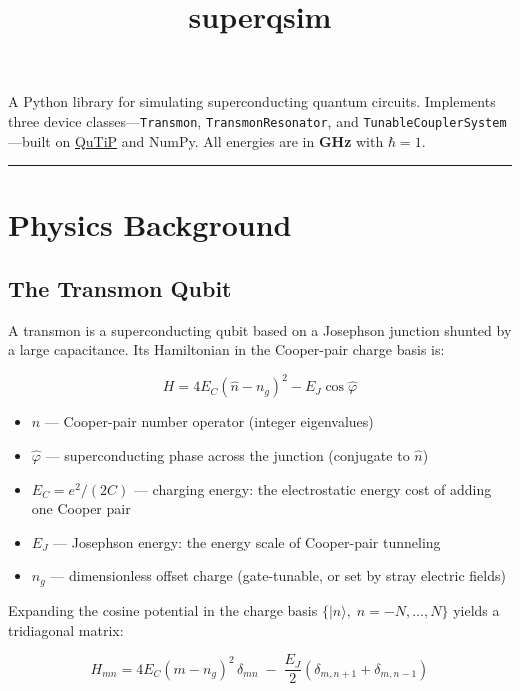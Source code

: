 \documentclass[11pt]{article}
\title{\textbf{superqsim}}
\author{}
\date{}
\newcommand{\ket}[1]{|#1\rangle}
\begin{document}
\maketitle

A Python library for simulating superconducting quantum circuits. Implements three device
classes---\texttt{Transmon}, \texttt{TransmonResonator}, and
\texttt{TunableCouplerSystem}---built on \href{https://qutip.org/}{QuTiP} and NumPy. All
energies are in \textbf{GHz} with $\hbar = 1$.

\hrule
\vspace{1em}

\section{Physics Background}

\subsection{The Transmon Qubit}

A transmon is a superconducting qubit based on a Josephson junction shunted by a large
capacitance. Its Hamiltonian in the Cooper-pair charge basis is:

\begin{equation}
  H = 4E_C\!\left(\hat{n} - n_g\right)^2 - E_J \cos\hat{\varphi}
\end{equation}

\begin{itemize}
  \item $\hat{n}$ --- Cooper-pair number operator (integer eigenvalues)
  \item $\hat{\varphi}$ --- superconducting phase across the junction (conjugate to $\hat{n}$)
  \item $E_C = e^2/(2C)$ --- charging energy: the electrostatic energy cost of adding one
        Cooper pair
  \item $E_J$ --- Josephson energy: the energy scale of Cooper-pair tunneling
  \item $n_g$ --- dimensionless offset charge (gate-tunable, or set by stray electric fields)
\end{itemize}

Expanding the cosine potential in the charge basis $\{\ket{n},\; n = -N,\ldots,N\}$ yields a
tridiagonal matrix:

\begin{equation}
  H_{mn} = 4E_C(m - n_g)^2\,\delta_{mn}
            \;-\; \frac{E_J}{2}\!\left(\delta_{m,n+1} + \delta_{m,n-1}\right)
\end{equation}
\end{document}
